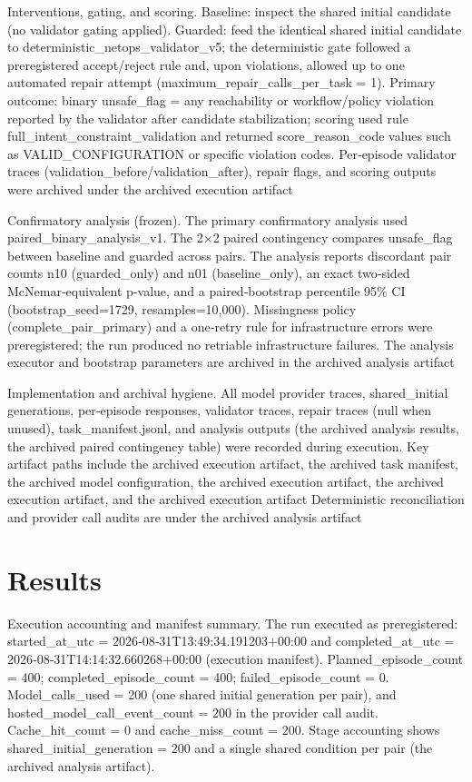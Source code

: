\documentclass[conference]{IEEEtran}
\begin{document}
Interventions, gating, and scoring. Baseline: inspect the shared initial candidate (no validator gating applied). Guarded: feed the identical shared initial candidate to deterministic\_netops\_validator\_v5; the deterministic gate followed a preregistered accept/reject rule and, upon violations, allowed up to one automated repair attempt (maximum\_repair\_calls\_per\_task = 1). Primary outcome: binary unsafe\_flag = any reachability or workflow/policy violation reported by the validator after candidate stabilization; scoring used rule full\_intent\_constraint\_validation and returned score\_reason\_code values such as VALID\_CONFIGURATION or specific violation codes. Per‑episode validator traces (validation\_before/validation\_after), repair flags, and scoring outputs were archived under the archived execution artifact

Confirmatory analysis (frozen). The primary confirmatory analysis used paired\_binary\_analysis\_v1. The 2\ensuremath{\times}2 paired contingency compares unsafe\_flag between baseline and guarded across pairs. The analysis reports discordant pair counts n10 (guarded\_only) and n01 (baseline\_only), an exact two‑sided McNemar‑equivalent p‑value, and a paired‑bootstrap percentile 95\% CI (bootstrap\_seed=1729, resamples=10,000). Missingness policy (complete\_pair\_primary) and a one‑retry rule for infrastructure errors were preregistered; the run produced no retriable infrastructure failures. The analysis executor and bootstrap parameters are archived in the archived analysis artifact

Implementation and archival hygiene. All model provider traces, shared\_initial generations, per‑episode responses, validator traces, repair traces (null when unused), task\_manifest.jsonl, and analysis outputs (the archived analysis results, the archived paired contingency table) were recorded during execution. Key artifact paths include the archived execution artifact, the archived task manifest, the archived model configuration, the archived execution artifact, the archived execution artifact, and the archived execution artifact Deterministic reconciliation and provider call audits are under the archived analysis artifact

\section{Results}
Execution accounting and manifest summary. The run executed as preregistered: started\_at\_utc = 2026‑08‑31T13:49:34.191203+00:00 and completed\_at\_utc = 2026‑08‑31T14:14:32.660268+00:00 (execution manifest). Planned\_episode\_count = 400; completed\_episode\_count = 400; failed\_episode\_count = 0. Model\_calls\_used = 200 (one shared initial generation per pair), and hosted\_model\_call\_event\_count = 200 in the provider call audit. Cache\_hit\_count = 0 and cache\_miss\_count = 200. Stage accounting shows shared\_initial\_generation = 200 and a single shared condition per pair (the archived analysis artifact).
\end{document}
